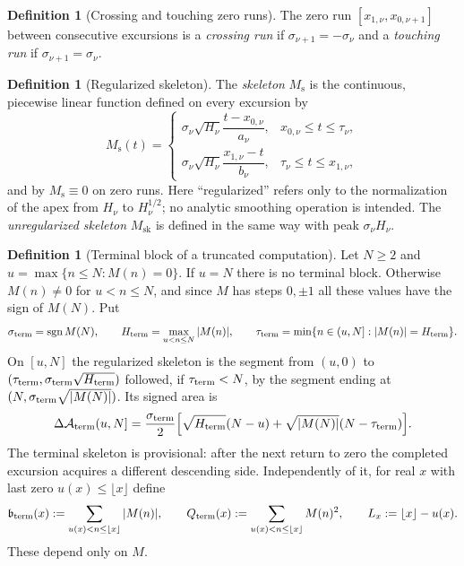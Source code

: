 \documentclass[11pt]{amsart}
\numberwithin{equation}{section}
\theoremstyle{plain}
\theoremstyle{definition}
\newtheorem{definition}[theorem]{Definition}
\theoremstyle{remark}
\DeclareMathOperator{\sgn}{sgn}
\newcommand{\Ms}{M_{\mathrm{s}}}
\newcommand{\Msk}{M_{\mathrm{sk}}}
\newcommand{\Anet}{\mathcal{A}}
\begin{document}
\begin{definition}[Crossing and touching zero runs]
\label{def:crossing_touching}
The zero run $[x_{1,\nu},x_{0,\nu+1}]$ between consecutive excursions is a
\emph{crossing run} if $\sigma_{\nu+1}=-\sigma_\nu$ and a \emph{touching run}
if $\sigma_{\nu+1}=\sigma_\nu$.
\end{definition}

\begin{definition}[Regularized skeleton]
\label{def:Ms}
The \emph{skeleton} $\Ms$ is the continuous, piecewise linear function
defined on every excursion by
\begin{equation}
\label{eq:Ms_def}
\Ms(t)=
\begin{cases}
\sigma_\nu\sqrt{H_\nu}\dfrac{t-x_{0,\nu}}{a_\nu},
 &x_{0,\nu}\le t\le\tau_\nu,\\[2ex]
\sigma_\nu\sqrt{H_\nu}\dfrac{x_{1,\nu}-t}{b_\nu},
 &\tau_\nu\le t\le x_{1,\nu},
\end{cases}
\end{equation}
and by $\Ms\equiv0$ on zero runs.  Here ``regularized'' refers only to
the normalization of the apex from $H_\nu$ to $H_\nu^{1/2}$; no analytic
smoothing operation is intended.  The \emph{unregularized skeleton} $\Msk$
is defined in the same way with peak $\sigma_\nu H_\nu$.
\end{definition}

\begin{definition}[Terminal block of a truncated computation]
\label{def:Ms-terminal}
Let $N\ge2$ and $u=\max\{n\le N:M(n)=0\}$. If $u=N$ there is no terminal
block. Otherwise $M(n)\ne0$ for $u<n\le N$, and since $M$ has steps
$0,\pm1$ all these values have the sign of $M(N)$. Put
\[
\sigma_{\rm term}=\sgn M(N),\qquad
H_{\rm term}=\max_{u<n\le N}|M(n)|,\qquad
\tau_{\rm term}=\min\{n\in(u,N]:|M(n)|=H_{\rm term}\}.
\]
On $[u,N]$ the regularized skeleton is the segment from $(u,0)$ to
$(\tau_{\rm term},\sigma_{\rm term}\sqrt{H_{\rm term}})$ followed, if
$\tau_{\rm term}<N$, by the segment ending at
$(N,\sigma_{\rm term}\sqrt{|M(N)|})$. Its signed area is
\[
\Delta\Anet_{\rm term}(u,N]=\frac{\sigma_{\rm term}}2
\Bigl[\sqrt{H_{\rm term}}(N-u)+
\sqrt{|M(N)|}(N-\tau_{\rm term})\Bigr].
\]
The terminal skeleton is provisional: after the next return to zero the
completed excursion acquires a different descending side. Independently of
it, for real $x$ with last zero $u(x)\le\lfloor x\rfloor$ define
\[
\mathfrak b_{\rm term}(x):=\sum_{u(x)<n\le\lfloor x\rfloor}|M(n)|,\qquad
Q_{\rm term}(x):=\sum_{u(x)<n\le\lfloor x\rfloor}M(n)^2,\qquad
L_x:=\lfloor x\rfloor-u(x).
\]
These depend only on $M$.
\end{definition}
\end{document}
